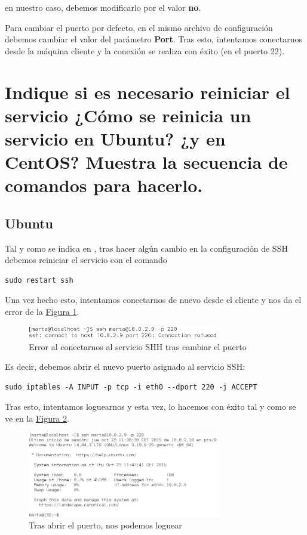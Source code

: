 \documentclass[10pt,a4paper,spanish]{article}
\numberwithin{equation}{section} %
\numberwithin{figure}{section} %
\numberwithin{table}{section} %
\begin{document}
en nuestro caso, debemos modificarlo por el valor \textbf{no}.

Para cambiar el puerto por defecto, en el mismo archivo de configuración debemos cambiar el valor del parámetro \textbf{Port}. Tras esto, intentamos conectarnos desde la máquina cliente y la conexión se realiza con éxito (en el puerto 22).

\section{Indique si es necesario reiniciar el servicio ¿Cómo se reinicia un servicio en Ubuntu? ¿y en CentOS? Muestra la secuencia de comandos para hacerlo.}
\subsection{Ubuntu}
Tal y como se indica en \cite{ubuconf}, tras hacer algún cambio en la configuración de SSH debemos reiniciar el servicio con el comando
\begin{verbatim}
sudo restart ssh
\end{verbatim}

Una vez hecho esto, intentamos conectarnos de nuevo desde el cliente y nos da el error de la \hyperref[errorssh]{Figura \ref*{errorssh}}.

\begin{figure}[!h]
    \centering
    \includegraphics[width=0.75\textwidth]{13}
    \caption{Error al conectarnos al servicio SHH tras cambiar el puerto}
    \label{errorssh}
\end{figure}

Es decir, debemos abrir el nuevo puerto asignado al servicio SSH:

\begin{verbatim}
sudo iptables -A INPUT -p tcp -i eth0 --dport 220 -j ACCEPT
\end{verbatim}

Tras esto, intentamos loguearnos y esta vez, lo hacemos con éxito tal y como se ve en la \hyperref[puerto]{Figura \ref*{puerto}}.

\begin{figure}[!h]
    \centering
    \includegraphics[width=0.75\textwidth]{14}
    \caption{Tras abrir el puerto, nos podemos loguear}
    \label{puerto}
\end{figure}
\end{document}
